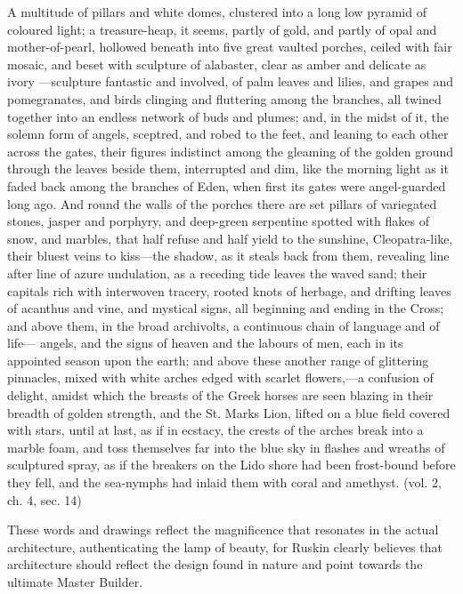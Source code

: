 {\color{black}
A multitude of pillars and white domes, clustered into a long low
pyramid of coloured light; a treasure-heap, it seems, partly of gold,
and partly of opal and mother-of-pearl, hollowed beneath into five
great vaulted porches, ceiled with fair mosaic, and beset with
sculpture of alabaster, clear as amber and delicate as ivory —sculpture
fantastic and involved, of palm leaves and lilies, and grapes and
pomegranates, and birds clinging and fluttering among the branches, all
twined together into an endless network of buds and plumes; and, in the
midst of it, the solemn form of angels, sceptred, and robed to the
feet, and leaning to each other across the gates, their figures
indistinct among the gleaming of the golden ground through the leaves
beside them, interrupted and dim, like the morning light as it faded
back among the branches of Eden, when first its gates were
angel-guarded long ago.  And round the walls of the porches there are
set pillars of variegated stones, jasper and porphyry, and deep-green
serpentine spotted with flakes of snow, and marbles, that half refuse
and half yield to the sunshine, Cleopatra-like, {\textquotedbl}their
bluest veins to kiss{\textquotedbl}—the shadow, as it steals back from
them, revealing line after line of azure undulation, as a receding tide
leaves the waved sand; their capitals rich with interwoven tracery,
rooted knots of herbage, and drifting leaves of acanthus and vine, and
mystical signs, all beginning and ending in the Cross; and above them,
in the broad archivolts, a continuous chain of language and of life—
angels, and the signs of heaven and the labours of men, each in its
appointed season upon the earth; and above these another range of
glittering pinnacles, mixed with white arches edged with scarlet
flowers,—a confusion of delight, amidst which the breasts of the Greek
horses are seen blazing in their breadth of golden strength, and the
St. Mark{\textquotesingle}s Lion, lifted on a blue field covered with
stars, until at last, as if in ecstacy, the crests of the arches break
into a marble foam, and toss themselves far into the blue sky in
flashes and wreaths of sculptured spray, as if the breakers on the Lido
shore had been frost-bound before they fell, and the sea-nymphs had
inlaid them with coral and amethyst.  (vol. 2, ch. 4, sec. 14)}

{\color{black}
These words and drawings reflect the magnificence that resonates in the
actual architecture, authenticating the lamp of beauty, for Ruskin
clearly believes that architecture should reflect the design found in
nature and point towards the ultimate Master Builder.  }


